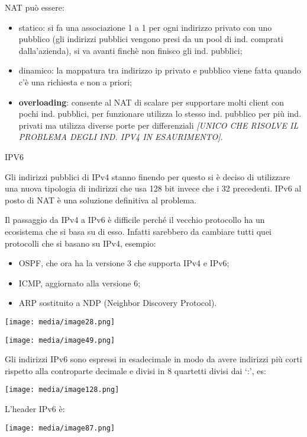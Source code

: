 NAT può essere:

\begin{itemize}
\item
  statico: si fa una associazione 1 a 1 per ogni indirizzo privato con
  uno pubblico (gli indirizzi pubblici vengono presi da un pool di ind.
  comprati dalla'azienda), si va avanti finchè non finisco gli ind.
  pubblici;
\item
  dinamico: la mappatura tra indirizzo ip privato e pubblico viene fatta
  quando c'è una richiesta e non a priori;
\item
  \textbf{overloading}: consente al NAT di scalare per supportare molti
  client con pochi ind. pubblici, per funzionare utilizza lo stesso ind.
  pubblico per più ind. privati ma utilizza diverse porte per
  differenziali \emph{{[}UNICO CHE RISOLVE IL PROBLEMA DEGLI IND. IPV4
  IN ESAURIMENTO{]}}.
\end{itemize}

IPV6

Gli indirizzi pubblici di IPv4 stanno finendo per questo si è deciso di
utilizzare una nuova tipologia di indirizzi che usa 128 bit invece che i
32 precedenti. IPv6 al posto di NAT è una soluzione definitiva al
problema.

Il passaggio da IPv4 a IPv6 è difficile perché il vecchio protocollo ha
un ecosistema che si basa su di esso. Infatti sarebbero da cambiare
tutti quei protocolli che si basano su IPv4, esempio:

\begin{itemize}
\item
  OSPF, che ora ha la versione 3 che supporta IPv4 e IPv6;
\item
  ICMP, aggiornato alla versione 6;
\item
  ARP sostituito a NDP (Neighbor Discovery Protocol).
\end{itemize}

\texttt{[image: media/image28.png]}

\texttt{[image: media/image49.png]}

Gli indirizzi IPv6 sono espressi in esadecimale in modo da avere
indirizzi più corti rispetto alla controparte decimale e divisi in 8
quartetti divisi dai `:', es:

\texttt{[image: media/image128.png]}

L'header IPv6 è:

\texttt{[image: media/image87.png]}


